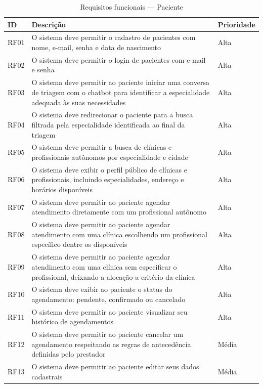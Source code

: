 \begin{table}[H]
  \centering
  \caption{Requisitos funcionais --- Paciente}
  \label{tab:patient-requirements}
  \begin{tabular}{p{1.2cm}p{7cm}p{2cm}}
    \toprule
    \textbf{ID} &
    \textbf{Descrição} &
    \textbf{Prioridade} \\
    \midrule
    RF01 & O sistema deve permitir o cadastro de
           pacientes com nome, e-mail, senha e
           data de nascimento
         & Alta \\
    RF02 & O sistema deve permitir o login de
           pacientes com e-mail e senha
         & Alta \\
    RF03 & O sistema deve permitir ao paciente
           iniciar uma conversa de triagem com
           o chatbot para identificar a
           especialidade adequada às suas
           necessidades
         & Alta \\
    RF04 & O sistema deve redirecionar o paciente
           para a busca filtrada pela especialidade
           identificada ao final da triagem
         & Alta \\
    RF05 & O sistema deve permitir a busca de
           clínicas e profissionais autônomos
           por especialidade e cidade
         & Alta \\
    RF06 & O sistema deve exibir o perfil público
           de clínicas e profissionais, incluindo
           especialidades, endereço e horários
           disponíveis
         & Alta \\
    RF07 & O sistema deve permitir ao paciente
           agendar atendimento diretamente com
           um profissional autônomo
         & Alta \\
    RF08 & O sistema deve permitir ao paciente
           agendar atendimento com uma clínica
           escolhendo um profissional específico
           dentre os disponíveis
         & Alta \\
    RF09 & O sistema deve permitir ao paciente
           agendar atendimento com uma clínica
           sem especificar o profissional,
           deixando a alocação a critério
           da clínica
         & Alta \\
    RF10 & O sistema deve exibir ao paciente o
           status do agendamento: pendente,
           confirmado ou cancelado
         & Alta \\
    RF11 & O sistema deve permitir ao paciente
           visualizar seu histórico de
           agendamentos
         & Alta \\
    RF12 & O sistema deve permitir ao paciente
           cancelar um agendamento respeitando
           as regras de antecedência definidas
           pelo prestador
         & Média \\
    RF13 & O sistema deve permitir ao paciente
           editar seus dados cadastrais
         & Média \\
    \bottomrule
  \end{tabular}
\end{table}

